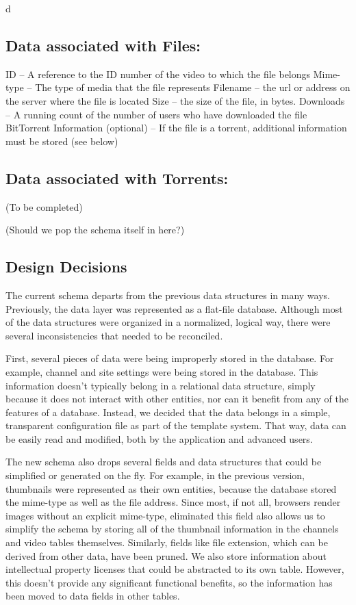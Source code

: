 d\documentclass[a4paper,12pt]{report}
\begin{document}
{{\subsection{Data associated with Files:}
ID – A reference to the ID number of the video to which the file belongs
Mime-type – The type of media that the file represents
Filename – the url or address on the server where the file is located
Size – the size of the file, in bytes.
Downloads – A running count of the number of users who have downloaded the file
BitTorrent Information (optional) – If the file is a torrent, additional information must be stored (see below)

\subsection{Data associated with Torrents:}
(To be completed)

(Should we pop the schema itself in here?)

\subsection{Design Decisions}
The current schema departs from the previous data structures in many ways. Previously, the data layer was represented as a flat-file database. 
Although most of the data structures were organized in a normalized, logical way, there were several inconsistencies that needed to be reconciled.

First, several pieces of data were being improperly stored in the database. For example, channel and site settings were being stored in the database. This information doesn't typically belong in a relational data structure, simply because it does not interact with other entities, nor can it benefit from any of the features of a database. 
Instead, we decided that the data belongs in a simple, transparent configuration file as part of the template system. 
That way, data can be easily read and modified, both by the application and advanced users. 

The new schema also drops several fields and data structures that could be simplified or generated on the fly. 
For example, in the previous version, thumbnails were represented as their own entities, because the database stored the mime-type as well as the file address. 
Since most, if not all, browsers render images without an explicit mime-type, eliminated this field also allows us to simplify the schema by storing all of the thumbnail information in the channels and video tables themselves. Similarly, fields like file extension, which can be derived from other data, have been pruned. 
We also store information about intellectual property licenses that could be abstracted to its own table. 
However, this doesn't provide any significant functional benefits, so the information has been moved to data fields in other tables.

}}
\end{document}
